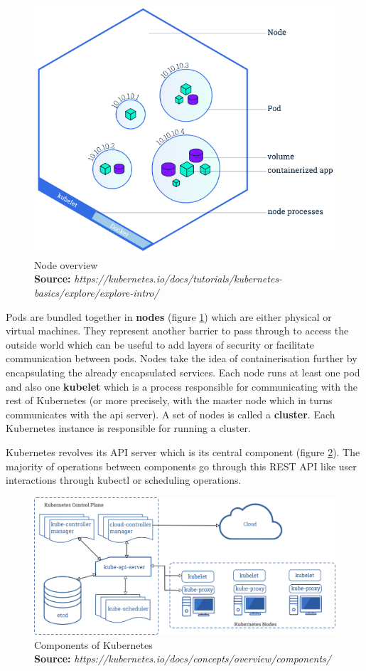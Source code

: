 \documentclass[12pt, a4paper]{memoir}
\newcommand*{\captionsource}[2]{%
    \caption[{#1}]{%
        #1%
        \\\hspace{\linewidth}%
	\textbf{Source:} \textit{#2}%
    }%
}
\begin{document}
\begin{figure}[h]
	\centering
	\includegraphics[scale=0.5]{../imgs/node-overview.png}
	\captionsource{Node overview}{https://kubernetes.io/docs/tutorials/kubernetes-basics/explore/explore-intro/}
	\label{fig:node-overview}
\end{figure}

Pods are bundled together in \textbf{nodes} (figure \ref{fig:node-overview})
which are either physical or virtual machines. They represent another barrier
to pass through to access the outside world which can be useful to add layers
of security or facilitate communication between pods. Nodes take the idea of
containerisation further by encapsulating the already encapsulated services.
Each node runs at least one pod and also one \textbf{kubelet} which is a
process responsible for communicating with the rest of Kubernetes (or more
precisely, with the master node which in turns communicates with the api
server). A set of nodes is called a \textbf{cluster}. Each Kubernetes instance
is responsible for running a cluster.

Kubernetes revolves its API server which is its central component (figure
\ref{fig:kube-components}). The majority of operations between components go
through this REST API like user interactions through kubectl or scheduling
operations.

\begin{figure}[h]
	\centering
	\includegraphics[width=\textwidth]{../imgs/components-of-kubernetes.png}
	\captionsource{Components of Kubernetes}{https://kubernetes.io/docs/concepts/overview/components/}
	\label{fig:kube-components}
\end{figure}
\end{document}
